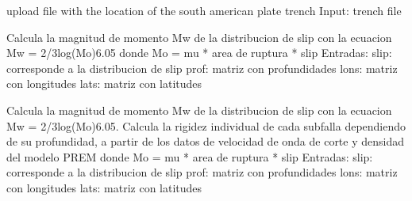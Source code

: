 \documentclass[letterpaper,10pt,english]{sphinxmanual}
\begin{document}

\begin{fulllineitems}
\label{\detokenize{main:main.load_trench}}
\pysigstartsignatures
{}
\pysigstopsignatures
\sphinxAtStartPar
upload file with the location of the south american plate trench
Input: trench file

\end{fulllineitems}


\begin{fulllineitems}
\label{\detokenize{main:main.magnitud_momento}}
\pysigstartsignatures
{}
\pysigstopsignatures
\sphinxAtStartPar
Calcula la magnitud de momento Mw de la distribucion de slip con la ecuacion
Mw = 2/3log(Mo)\sphinxhyphen{}6.05
donde Mo = mu * area de ruptura * slip
Entradas: 
slip: corresponde a la distribucion de slip 
prof: matriz con profundidades
lons: matriz con longitudes
lats: matriz con latitudes

\end{fulllineitems}


\begin{fulllineitems}
\label{\detokenize{main:main.magnitud_momento_PREM}}
\pysigstartsignatures
{}
\pysigstopsignatures
\sphinxAtStartPar
Calcula la magnitud de momento Mw de la distribucion de slip con la ecuacion
Mw = 2/3log(Mo)\sphinxhyphen{}6.05. Calcula la rigidez individual de cada subfalla dependiendo de
su profundidad, a partir de los datos de velocidad de onda de corte y densidad del 
modelo PREM
donde Mo = mu * area de ruptura * slip
Entradas: 
slip: corresponde a la distribucion de slip 
prof: matriz con profundidades
lons: matriz con longitudes
lats: matriz con latitudes

\end{fulllineitems}
\end{document}
